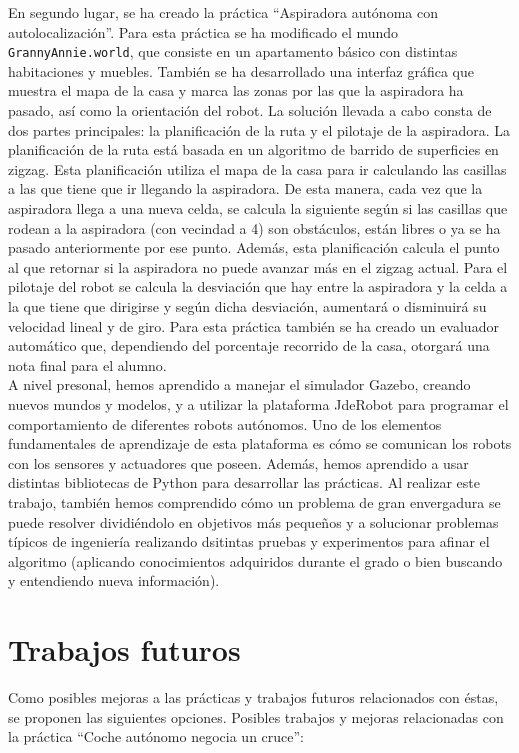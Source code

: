 En segundo lugar, se ha creado la práctica ``Aspiradora autónoma con autolocalización''. Para esta práctica se ha modificado el mundo \texttt{GrannyAnnie.world}, que consiste en un apartamento básico con distintas habitaciones y muebles. También se ha desarrollado una interfaz gráfica que muestra el mapa de la casa y marca las zonas por las que la aspiradora ha pasado, así como la orientación del robot. La solución llevada a cabo consta de dos partes principales: la planificación de la ruta y el pilotaje de la aspiradora. La planificación de la ruta está basada en un algoritmo de barrido de superficies en zigzag. Esta planificación utiliza el mapa de la casa para ir calculando las casillas a las que tiene que ir llegando la aspiradora. De esta manera, cada vez que la aspiradora llega a una nueva celda, se calcula la siguiente según si las casillas que rodean a la aspiradora (con vecindad a 4) son obstáculos, están libres o ya se ha pasado anteriormente por ese punto. Además, esta planificación calcula el punto al que retornar si la aspiradora no puede avanzar más en el zigzag actual. Para el pilotaje del robot se calcula la desviación que hay entre la aspiradora y la celda a la que tiene que dirigirse y según dicha desviación, aumentará o disminuirá su velocidad lineal y de giro. Para esta práctica también se ha creado un evaluador automático que, dependiendo del porcentaje recorrido de la casa, otorgará una nota final para el alumno.\\

A nivel presonal, hemos aprendido a manejar el simulador Gazebo, creando nuevos mundos y modelos, y a utilizar la plataforma JdeRobot para programar el comportamiento de diferentes robots autónomos. Uno de los elementos fundamentales de aprendizaje de esta plataforma es cómo se comunican los robots con los sensores y actuadores que poseen. Además, hemos aprendido a usar distintas bibliotecas de Python para desarrollar las prácticas. Al realizar este trabajo, también hemos comprendido cómo un problema de gran envergadura se puede resolver dividiéndolo en objetivos más pequeños y a solucionar problemas típicos de ingeniería realizando dsitintas pruebas y experimentos para afinar el algoritmo (aplicando conocimientos adquiridos durante el grado o bien buscando y entendiendo nueva información).


\section{Trabajos futuros}
Como posibles mejoras a las prácticas y trabajos futuros relacionados con éstas, se proponen las siguientes opciones. Posibles trabajos y mejoras relacionadas con la práctica ``Coche autónomo negocia un cruce'':

